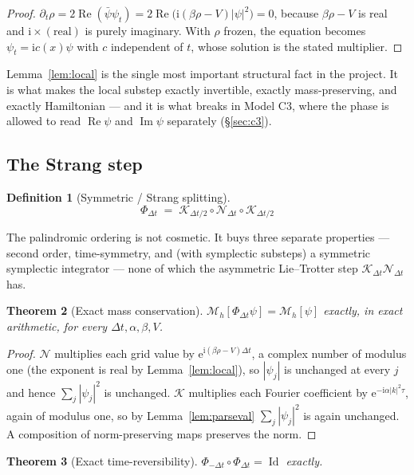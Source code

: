 \documentclass[11pt,a4paper]{article}
\theoremstyle{plain}
\newtheorem{theorem}{Theorem}[section]
\theoremstyle{definition}
\newtheorem{definition}[theorem]{Definition}
\theoremstyle{remark}
\newcommand{\iu}{\mathrm{i}}
\newcommand{\eu}{\mathrm{e}}
\newcommand{\dt}{\Delta t}
\newcommand{\Kop}{\mathcal{K}}
\newcommand{\Nop}{\mathcal{N}}
\newcommand{\Flow}{\Phi}
\newcommand{\Mass}{\mathcal{M}}
\DeclareMathOperator{\Imag}{Im}
\DeclareMathOperator{\Real}{Re}
\DeclareMathOperator{\Id}{Id}
\begin{document}
\begin{proof}
$\partial_t\rho = 2\Real(\bar\psi\psi_t) = 2\Real\bigl(\iu(\beta\rho-V)|\psi|^2\bigr) = 0$,
because $\beta\rho - V$ is real and $\iu\times(\text{real})$ is purely imaginary. With
$\rho$ frozen, the equation becomes $\psi_t = \iu c(x)\psi$ with $c$ independent of $t$,
whose solution is the stated multiplier.
\end{proof}

Lemma~\ref{lem:local} is the single most important structural fact in the project. It is
what makes the local substep exactly invertible, exactly mass-preserving, and exactly
Hamiltonian --- and it is what breaks in Model C3, where the phase is allowed to read
$\Real\psi$ and $\Imag\psi$ separately (\S\ref{sec:c3}).

\subsection{The Strang step}

\begin{definition}[Symmetric / Strang splitting]
\label{def:strang}
\[
\boxed{\;\Flow_{\dt} \;=\; \Kop_{\dt/2}\circ\Nop_{\dt}\circ\Kop_{\dt/2}\;}
\]
\end{definition}

The palindromic ordering is not cosmetic. It buys three separate properties --- second
order, time-symmetry, and (with symplectic substeps) a symmetric symplectic integrator ---
none of which the asymmetric Lie--Trotter step $\Kop_{\dt}\Nop_{\dt}$ has.

\begin{theorem}[Exact mass conservation]
\label{thm:strangmass}
$\Mass_h[\Flow_{\dt}\psi] = \Mass_h[\psi]$ exactly, in exact arithmetic, for every
$\dt,\alpha,\beta,V$.
\end{theorem}

\begin{proof}
$\Nop$ multiplies each grid value by $\eu^{\iu(\beta\rho-V)\dt}$, a complex number of
modulus one (the exponent is real by Lemma~\ref{lem:local}), so $|\psi_j|$ is unchanged
at every $j$ and hence $\sum_j|\psi_j|^2$ is unchanged. $\Kop$ multiplies each Fourier
coefficient by $\eu^{-\iu\alpha|k|^2\tau}$, again of modulus one, so by
Lemma~\ref{lem:parseval} $\sum_j|\psi_j|^2$ is again unchanged. A composition of
norm-preserving maps preserves the norm.
\end{proof}

\begin{theorem}[Exact time-reversibility]
\label{thm:strangrev}
$\Flow_{-\dt}\circ\Flow_{\dt} = \Id$ exactly.
\end{theorem}
\end{document}
